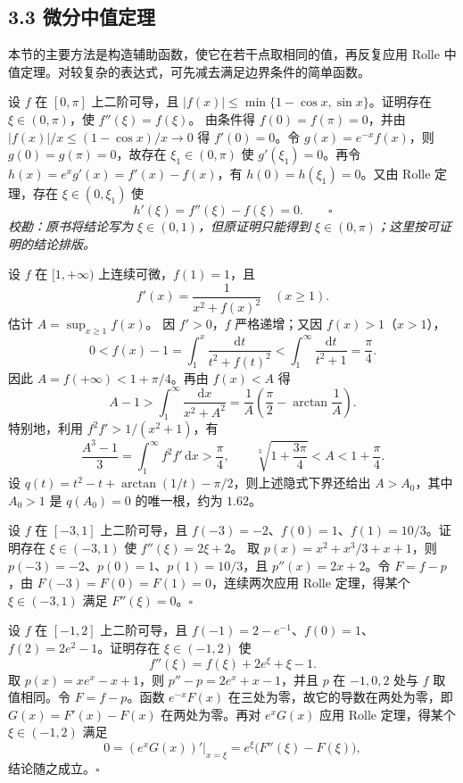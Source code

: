 \subsection*{3.3 微分中值定理}

本节的主要方法是构造辅助函数，使它在若干点取相同的值，再反复应用 Rolle 中值定理。对较复杂的表达式，可先减去满足边界条件的简单函数。

设 $f$ 在 $[0,\pi]$ 上二阶可导，且 $|f(x)|\leq\min\{1-\cos x,\sin x\}$。证明存在 $\xi\in(0,\pi)$，使 $f''(\xi)=f(\xi)$。
\pf 由条件得 $f(0)=f(\pi)=0$，并由 $|f(x)|/x\leq(1-\cos x)/x\to0$ 得 $f'(0)=0$。令 $g(x)=e^{-x}f(x)$，则 $g(0)=g(\pi)=0$，故存在 $\xi_1\in(0,\pi)$ 使 $g'(\xi_1)=0$。再令 $h(x)=e^xg'(x)=f'(x)-f(x)$，有 $h(0)=h(\xi_1)=0$。又由 Rolle 定理，存在 $\xi\in(0,\xi_1)$ 使
\[
h'(\xi)=f''(\xi)-f(\xi)=0.\qquad\square
\]
\noindent\textit{校勘：原书将结论写为 $\xi\in(0,1)$，但原证明只能得到 $\xi\in(0,\pi)$；这里按可证明的结论排版。}

设 $f$ 在 $[1,+\infty)$ 上连续可微，$f(1)=1$，且
\[
f'(x)=\frac1{x^2+f(x)^2}\quad(x\geq1).
\]
估计 $A=\sup_{x\geq1}f(x)$。
\sol 因 $f'>0$，$f$ 严格递增；又因 $f(x)>1$（$x>1$），
\[
0<f(x)-1=\int_1^x\frac{\mathrm dt}{t^2+f(t)^2}
<\int_1^\infty\frac{\mathrm dt}{t^2+1}=\frac\pi4.
\]
因此 $A=f(+\infty)<1+\pi/4$。再由 $f(x)<A$ 得
\[
A-1>\int_1^\infty\frac{\mathrm dx}{x^2+A^2}
=\frac1A\left(\frac\pi2-\arctan\frac1A\right).
\]
特别地，利用 $f^2f'>1/(x^2+1)$，有
\[
\frac{A^3-1}{3}=\int_1^\infty f^2f'\,\mathrm dx
>\frac\pi4,
\qquad
\sqrt[3]{1+\frac{3\pi}{4}}<A<1+\frac\pi4.
\]
设 $q(t)=t^2-t+\arctan(1/t)-\pi/2$，则上述隐式下界还给出 $A>A_0$，其中 $A_0>1$ 是 $q(A_0)=0$ 的唯一根，约为 $1.62$。

设 $f$ 在 $[-3,1]$ 上二阶可导，且 $f(-3)=-2$、$f(0)=1$、$f(1)=10/3$。证明存在 $\xi\in(-3,1)$ 使 $f''(\xi)=2\xi+2$。
\pf 取 $p(x)=x^2+x^3/3+x+1$，则 $p(-3)=-2$、$p(0)=1$、$p(1)=10/3$，且 $p''(x)=2x+2$。令 $F=f-p$，由 $F(-3)=F(0)=F(1)=0$，连续两次应用 Rolle 定理，得某个 $\xi\in(-3,1)$ 满足 $F''(\xi)=0$。\hfill$\square$

设 $f$ 在 $[-1,2]$ 上二阶可导，且 $f(-1)=2-e^{-1}$、$f(0)=1$、$f(2)=2e^2-1$。证明存在 $\xi\in(-1,2)$ 使
\[
f''(\xi)=f(\xi)+2e^\xi+\xi-1.
\]
\pf 取 $p(x)=xe^x-x+1$，则 $p''-p=2e^x+x-1$，并且 $p$ 在 $-1,0,2$ 处与 $f$ 取值相同。令 $F=f-p$。函数 $e^{-x}F(x)$ 在三处为零，故它的导数在两处为零，即 $G(x)=F'(x)-F(x)$ 在两处为零。再对 $e^xG(x)$ 应用 Rolle 定理，得某个 $\xi\in(-1,2)$ 满足
\[
0=(e^xG(x))'\big|_{x=\xi}=e^\xi\bigl(F''(\xi)-F(\xi)\bigr),
\]
结论随之成立。\hfill$\square$

